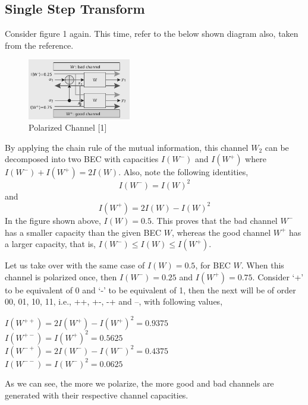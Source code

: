 \documentclass{report}
\begin{document}
\subsection*{Single Step Transform}
Consider figure 1 again. This time, refer to the below shown diagram also, taken from the reference. 
\begin{figure}[H]
\centering
\includegraphics[width=0.4\textwidth, height=0.2\textheight]{w2polar.png}
\caption{Polarized Channel [1]}
\end{figure}
By applying the chain rule of the mutual information, this channel $W_{2}$ can be decomposed into two BEC with capacities $I(W^{-})$ and $I(W^{+})$ where $I(W^{-}) + I(W^{+}) = 2I(W)$. Also, note the following identities,
\begin{equation}
I(W^{-}) = I(W)^{2}
\end{equation}
and 
\begin{equation}
I(W^{+}) = 2I(W) - I(W)^{2}
\end{equation}
In the figure shown above, $I(W)=0.5$. This proves that the bad channel $W^{-}$ has a smaller capacity than the given BEC $W$, whereas the good channel $W^{+}$ has a larger capacity, that is, $I(W^{-} ) \leq I(W) \leq I(W^{+})$. 
\par Let us take over with the same case of $I(W)=0.5$, for BEC $W$. When this channel is polarized once, then $I(W^{-}) = 0.25$ and $I(W^{+}) = 0.75$. Consider `+' to be equivalent of 0 and `-' to be equivalent of 1, then the next will be of order 00, 01, 10, 11, i.e., ++, +-, -+ and --, with following values,
\begin{center}
$I(W^{++}) = 2I(W^{+}) - I(W^{+})^{2} = 0.9375$ \\
$I(W^{+-}) = I(W^{+})^{2} = 0.5625$ \\
$I(W^{-+}) = 2I(W^{-}) - I(W^{-})^{2} = 0.4375$ \\
$I(W^{--}) = I(W^{-})^{2} = 0.0625$ 
\end{center}

As we can see, the more we polarize, the more good and bad channels are generated with their respective channel capacities.
\end{document}
